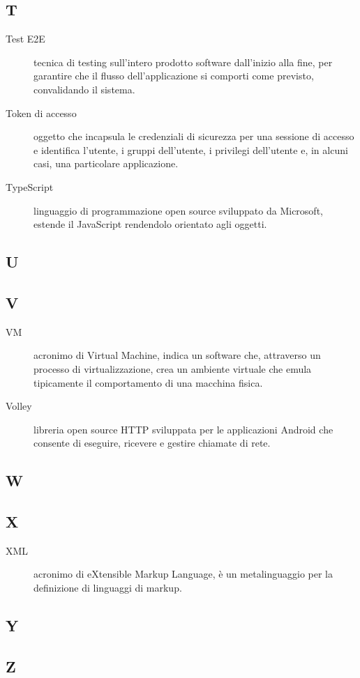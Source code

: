 \documentclass[../../../manuale.sviluppatore.tex]{subfiles}
\begin{document}
\subsection{T}

\begin{description}
    \item[Test E2E] tecnica di testing sull'intero prodotto software dall'inizio alla fine, per garantire che il flusso dell'applicazione si comporti come previsto, convalidando il sistema.
    \item[Token di accesso] oggetto che incapsula le credenziali di sicurezza per una sessione di accesso e identifica l'utente, i gruppi dell'utente, i privilegi dell'utente e, in alcuni casi, una particolare applicazione.
    \item[TypeScript] linguaggio di programmazione open source sviluppato da Microsoft, estende il JavaScript rendendolo orientato agli oggetti.
\end{description}

\subsection{U}

\subsection{V}

\begin{description}
    \item[VM] acronimo di Virtual Machine, indica un software che, attraverso un processo di virtualizzazione, crea un ambiente virtuale che emula tipicamente il comportamento di una macchina fisica.
    \item[Volley] libreria open source HTTP sviluppata per le applicazioni Android che consente di eseguire, ricevere e gestire chiamate di rete.
\end{description}

\subsection{W}

\subsection{X}
\begin{description}
    \item[XML] acronimo di eXtensible Markup Language, è un metalinguaggio per la definizione di linguaggi di markup.
\end{description}

\subsection{Y}

\subsection{Z}
\end{document}
